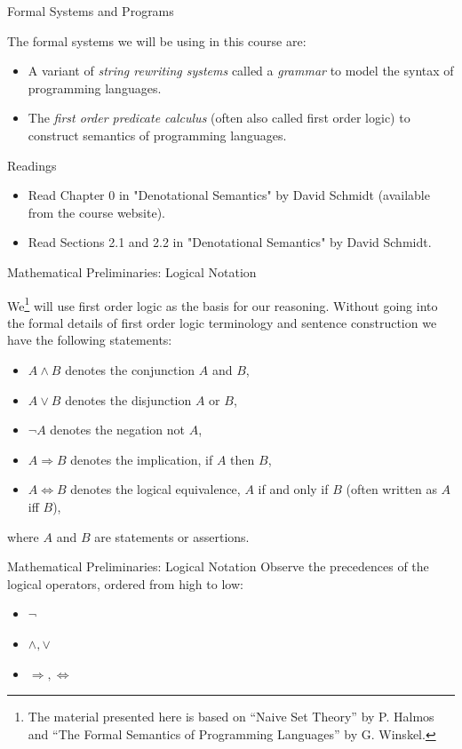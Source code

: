 \documentclass{beamer}
\begin{document}
\begin{frame}{Formal Systems and Programs}

The formal systems we will be using in this course are:
\begin{itemize}
\item A variant of {\em string rewriting systems} called a {\em grammar} to model the syntax of
programming languages.
\item The {\em first order predicate calculus} (often also called first order logic) to construct semantics of programming languages.
\end{itemize}
\end{frame}

\begin{frame}{Readings}
\begin{itemize}
\item Read Chapter 0 in "Denotational Semantics" by David Schmidt (available from the course website).
\item Read Sections 2.1 and 2.2 in "Denotational Semantics" by David Schmidt.
\end{itemize}
\end{frame}

\begin{frame}{\large Mathematical  Preliminaries: Logical Notation}

We\footnote{\tiny The material presented here is based on ``Naive Set Theory'' by P. Halmos and ``The Formal Semantics of Programming Languages'' by G. Winskel.}
will use first order logic as the basis for our reasoning.  Without going into the formal details
of first order logic terminology and sentence construction we have the following statements:
\begin{itemize}
\item $A \wedge B$ denotes the conjunction $A$ and $B$,
\item $A \vee B$ denotes the disjunction $A$ or $B$,
\item $\neg A$ denotes the negation not $A$,
\item $A \Rightarrow B$ denotes the implication, if $A$ then $B$,
\item $A \Leftrightarrow B$ denotes the logical equivalence, $A$ if and only if $B$ (often
written as $A$ iff $B$),
\end{itemize}
where $A$ and $B$ are statements or assertions.
\vspace{.1in}
 \end{frame}

\begin{frame}{\large Mathematical  Preliminaries: Logical Notation}
Observe the precedences of the logical operators, ordered from high to low:
\begin{itemize}
\item $\neg$
\item $\wedge,\vee$
\item $\Rightarrow, \Leftrightarrow$
\end{itemize}
\end{frame}
\end{document}
